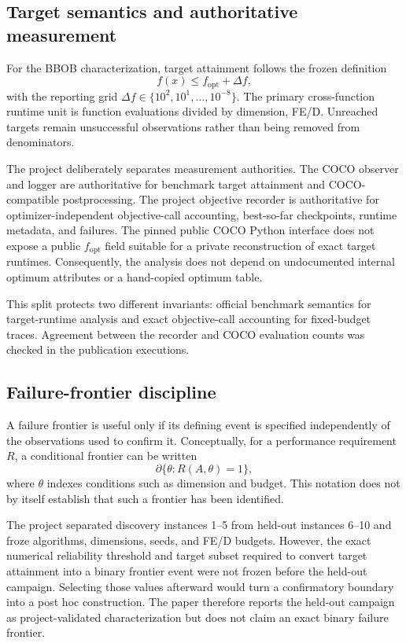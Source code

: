 \subsection{Target semantics and authoritative measurement}

For the BBOB characterization, target attainment follows the frozen definition
\begin{equation}
f(x)\leq f_{\mathrm{opt}}+\Delta f,
\end{equation}
with the reporting grid \(\Delta f\in\{10^{2},10^{1},\ldots,10^{-8}\}\). The primary cross-function runtime unit is function evaluations divided by dimension, FE/D. Unreached targets remain unsuccessful observations rather than being removed from denominators.

The project deliberately separates measurement authorities. The COCO observer and logger are authoritative for benchmark target attainment and COCO-compatible postprocessing. The project objective recorder is authoritative for optimizer-independent objective-call accounting, best-so-far checkpoints, runtime metadata, and failures. The pinned public COCO Python interface does not expose a public \(f_{\mathrm{opt}}\) field suitable for a private reconstruction of exact target runtimes. Consequently, the analysis does not depend on undocumented internal optimum attributes or a hand-copied optimum table.

This split protects two different invariants: official benchmark semantics for target-runtime analysis and exact objective-call accounting for fixed-budget traces. Agreement between the recorder and COCO evaluation counts was checked in the publication executions.

\subsection{Failure-frontier discipline}

A failure frontier is useful only if its defining event is specified independently of the observations used to confirm it. Conceptually, for a performance requirement \(R\), a conditional frontier can be written
\begin{equation}
\partial\{\theta:R(A,\theta)=1\},
\end{equation}
where \(\theta\) indexes conditions such as dimension and budget. This notation does not by itself establish that such a frontier has been identified.

The project separated discovery instances 1--5 from held-out instances 6--10 and froze algorithms, dimensions, seeds, and FE/D budgets. However, the exact numerical reliability threshold and target subset required to convert target attainment into a binary frontier event were not frozen before the held-out campaign. Selecting those values afterward would turn a confirmatory boundary into a post hoc construction. The paper therefore reports the held-out campaign as project-validated characterization but does not claim an exact binary failure frontier.

